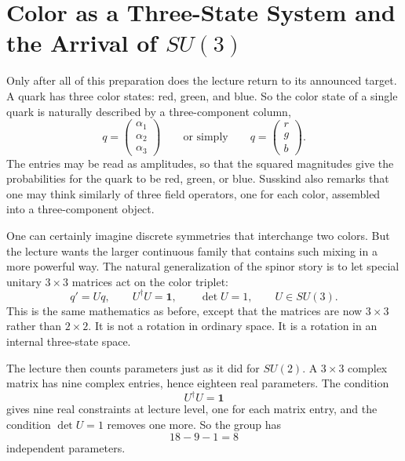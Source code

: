 \section{Color as a Three-State System and the Arrival of \(SU(3)\)}

Only after all of this preparation does the lecture return to its announced target. A quark has three color states: red, green, and blue. So the color state of a single quark is naturally described by a three-component column,
\begin{equation}
q=
\begin{pmatrix}
\alpha_1\\
\alpha_2\\
\alpha_3
\end{pmatrix}
\qquad \text{or simply} \qquad
q=
\begin{pmatrix}
r\\
g\\
b
\end{pmatrix}.
\end{equation}
The entries may be read as amplitudes, so that the squared magnitudes give the probabilities for the quark to be red, green, or blue. Susskind also remarks that one may think similarly of three field operators, one for each color, assembled into a three-component object.

One can certainly imagine discrete symmetries that interchange two colors. But the lecture wants the larger continuous family that contains such mixing in a more powerful way. The natural generalization of the spinor story is to let special unitary \(3\times 3\) matrices act on the color triplet:
\begin{equation}
q' = Uq,
\qquad
U^\dagger U=\mathbf 1,
\qquad
\det U=1,
\qquad
U\in SU(3).
\end{equation}
This is the same mathematics as before, except that the matrices are now \(3\times 3\) rather than \(2\times 2\). It is not a rotation in ordinary space. It is a rotation in an internal three-state space.

The lecture then counts parameters just as it did for \(SU(2)\). A \(3\times 3\) complex matrix has nine complex entries, hence eighteen real parameters. The condition
\[
U^\dagger U=\mathbf 1
\]
gives nine real constraints at lecture level, one for each matrix entry, and the condition \(\det U=1\) removes one more. So the group has
\begin{equation}
18-9-1=8
\end{equation}
independent parameters.

